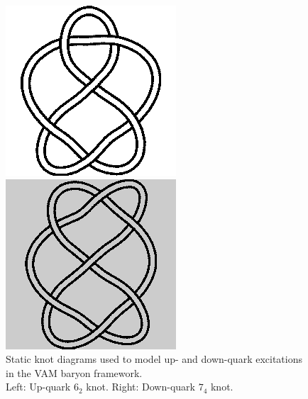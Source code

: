 \begin{figure}[H]
\centering
\begin{minipage}{0.45\textwidth}
    \centering
        \includegraphics[width=\textwidth]{images/6_2.png}
\end{minipage}
\hfill
\begin{minipage}{0.45\textwidth}
    \centering
        \includegraphics[width=\textwidth]{images/7_4.png}
\end{minipage}
    \caption{Static knot diagrams used to model up- and down-quark excitations in the VAM baryon framework.\\
            Left: Up-quark \(6_2\) knot. Right: Down-quark \(7_4\) knot.}
\end{figure}


